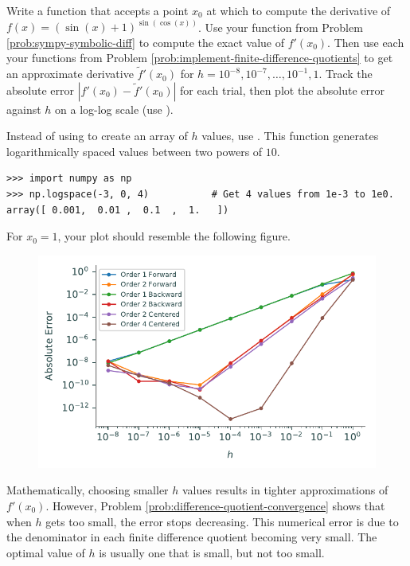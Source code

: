 \begin{problem} %
Write a function that accepts a point $x_0$ at which to compute the derivative of $f(x) = (\sin(x)+1)^{\sin(\cos(x))}$.
Use your function from Problem \ref{prob:sympy-symbolic-diff} to compute the exact value of $f'(x_0)$.
Then use each your functions from Problem \ref{prob:implement-finite-difference-quotients} to get an approximate derivative $\tilde{f}'(x_0)$ for $h=10^{-8},10^{-7},\ldots,10^{-1},1$.
Track the absolute error $|f'(x_0) - \tilde{f}'(x_0)|$ for each trial, then plot the absolute error against $h$ on a log-log scale (use ).

Instead of using  to create an array of $h$ values, use .
This function generates logarithmically spaced values between two powers of $10$.
\begin{lstlisting}
>>> import numpy as np
>>> np.logspace(-3, 0, 4)           # Get 4 values from 1e-3 to 1e0.
array([ 0.001,  0.01 ,  0.1  ,  1.   ])
\end{lstlisting}

For $x_0 = 1$, your plot should resemble the following figure.
\begin{figure}[H]
    \centering
    \includegraphics[width=.7\textwidth]{figures/error_plot.pdf}
\end{figure}
\label{prob:difference-quotient-convergence}
\end{problem}

\begin{warn}
Mathematically, choosing smaller $h$ values results in tighter approximations of $f'(x_0)$.
However, Problem \ref{prob:difference-quotient-convergence} shows that when $h$ gets too small, the error stops decreasing.
This numerical error is due to the denominator in each finite difference quotient becoming very small.
The optimal value of $h$ is usually one that is small, but not too small.
\end{warn}

